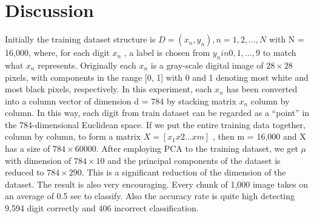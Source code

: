 \section{Discussion}
\label{sect:discussion}
Initially the training dataset structure is $D = {( x_n , y_n ), n = 1, 2,..., N }$ with N = 16,000, where, for each digit $x_n$ , a label is chosen from $y_n in {0,1,...,9}$ to match what $x_n$ represents. Originally each $x_n$ is a gray-scale digital image of $28\times28$ pixels, with components in the range [0, 1] with 0 and 1 denoting most white and most black pixels, respectively. In this experiment, each $x_n$ has been converted into a column vector of dimension d = 784 by stacking matrix $x_n$ column by column. In this way, each digit from train dataset can be regarded as a ``point'' in the 784-dimensional Euclidean space. If we put the entire training data together, column by column, to form a matrix $X = [x_1 x 2 ... x m]$ , then m = 16,000 and X has a size of $784\times60000$. 
After employing PCA to the training dataset, we get $\mu$ with dimension of $784\times10$ and the principal components of the dataset is reduced to $784\times290$. This is a significant reduction of the dimension of the dataset.
The result is also very encouraging. Every chunk of 1,000 image takes on an average of 0.5 sec to classify. Also the accuracy rate is quite high detecting 9,594 digit correctly and 406 incorrect classification. 